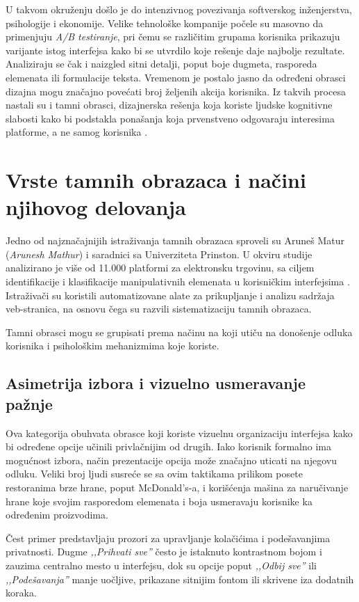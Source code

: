 \documentclass[12pt,a4paper]{article}
\begin{document}
U takvom okruženju došlo je do intenzivnog povezivanja softverskog inženjerstva, psihologije i ekonomije. Velike tehnološke kompanije počele su masovno da primenjuju \emph{A/B testiranje}, pri čemu se različitim grupama korisnika prikazuju varijante istog interfejsa kako bi se utvrdilo koje rešenje daje najbolje rezultate. Analiziraju se čak i naizgled sitni detalji, poput boje dugmeta, rasporeda elemenata ili formulacije teksta. Vremenom je postalo jasno da određeni obrasci dizajna mogu značajno povećati broj željenih akcija korisnika. Iz takvih procesa nastali su i tamni obrasci, dizajnerska rešenja koja koriste ljudske kognitivne slabosti kako bi podstakla ponašanja koja prvenstveno odgovaraju interesima platforme, a ne samog korisnika \cite{mathur2019dark}.

\section{Vrste tamnih obrazaca i načini njihovog delovanja}

Jedno od najznačajnijih istraživanja tamnih obrazaca sproveli su Aruneš Matur (\emph{Arunesh Mathur}) i saradnici sa Univerziteta Prinston. U okviru studije analizirano je više od 11.000 platformi za elektronsku trgovinu, sa ciljem identifikacije i klasifikacije manipulativnih elemenata u korisničkim interfejsima \cite{mathur2019dark}. Istraživači su koristili automatizovane alate za prikupljanje i analizu sadržaja veb-stranica, na osnovu čega su razvili sistematizaciju tamnih obrazaca.

Tamni obrasci mogu se grupisati prema načinu na koji utiču na donošenje odluka korisnika i psihološkim mehanizmima koje koriste.

\subsection{Asimetrija izbora i vizuelno usmeravanje pažnje}

Ova kategorija obuhvata obrasce koji koriste vizuelnu organizaciju interfejsa kako bi određene opcije učinili privlačnijim od drugih. Iako korisnik formalno ima mogućnost izbora, način prezentacije opcija može značajno uticati na njegovu odluku. Veliki broj ljudi susreće se sa ovim taktikama prilikom posete restoranima brze hrane, poput McDonald's-a, i korišćenja mašina za naručivanje hrane koje svojim rasporedom elemenata i boja usmeravaju korisnike ka određenim proizvodima.

Čest primer predstavljaju prozori za upravljanje kolačićima i podešavanjima privatnosti. Dugme \emph{,,Prihvati sve''} često je istaknuto kontrastnom bojom i zauzima centralno mesto u interfejsu, dok su opcije poput \emph{,,Odbij sve''} ili \emph{,,Podešavanja''} manje uočljive, prikazane sitnijim fontom ili skrivene iza dodatnih koraka.
\end{document}
